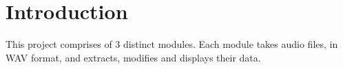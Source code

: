 \chapter{Introduction}

This project comprises of 3 distinct modules. Each module takes audio files, in WAV format, and extracts, modifies and displays their data.

